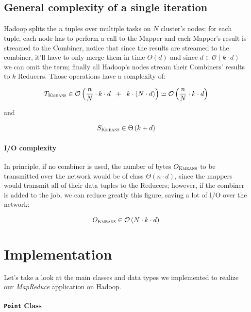 \documentclass[parskip=full]{report}
\begin{document}
\subsection{General complexity of a single iteration}

\paragraph{}
Hadoop splits the $n$ tuples over multiple tasks on $N$ cluster's nodes; for each tuple, each node has to 
perform a call to the Mapper and each Mapper's result is streamed to the 
Combiner, notice that since the results are streamed to the combiner, it'll 
have to only merge them in time $\Theta(d)$ and since $d \in \mathcal{O}(k\cdot 
d)$ we can omit the term; finally all Hadoop's nodes stream 
their Combiners' results to $k$ Reducers. Those operations have a complexity of:

\begin{equation}
\label{eq:it-t-complexity}
T_\textsc{Kmeans} \in \mathcal{O} \left(
	\dfrac{n}{N}\cdot k \cdot d \; \;+\; \;
	k \cdot \left(N \cdot d\right)
\right)
\simeq
\mathcal{O} \left(
	\dfrac{n}{N}\cdot k \cdot d
\right)
\end{equation}

and 

\[
S_\textsc{Kmeans} \in \Theta \left(k + d\right)
\]

\paragraph{I/O complexity}
In principle, if no combiner is used, the number of bytes $O_\textsc{Kmeans}$ 
to be 
transmitted over the network would be of class $\Theta(n \cdot d)$, since the 
mappers would transmit all of their data tuples to the Reducers; however, if 
the combiner is added to the job, we can reduce greatly this figure, saving a 
lot of I/O over the network:

\[
O_\textsc{Kmeans} \in \mathcal{O} \left(N \cdot k \cdot d\right)
\]

\section{Implementation}

Let's take a look at the main classes and data types we implemented to realize 
our \emph{MapReduce} application on Hadoop.

\paragraph{\texttt{Point} Class}
\end{document}
